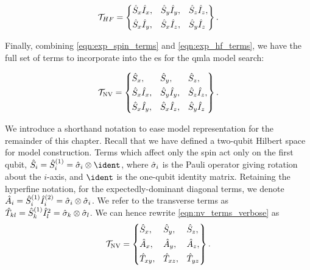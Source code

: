 \begin{equation}
    \mathcal{T}_{HF} = \left\{
    \begin{align}  
        \begin{split}
        & \hat{S}_x\hat{I}_x, && \hat{S}_y\hat{I}_y, && \hat{S}_z\hat{I}_z, \\
        & \hat{S}_x\hat{I}_y, && \hat{S}_x\hat{I}_z, && \hat{S}_y\hat{I}_z 
        \end{split}
    \end{align}
    \right\}.
    \label{eqn:exp_hf_terms}
\end{equation}

\par 

Finally, combining \cref{eqn:exp_spin_terms} and \cref{eqn:exp_hf_terms}, 
    we have the full set of terms to incorporate into the \gls{es} for the \gls{qmla} \gls{model search}: 

\begin{equation}
    \mathcal{T}_{\textrm{NV}} = \left\{
    \begin{align}
        & \hat{S}_x, && \hat{S}_y, && \hat{S}_z, \\
        & \hat{S}_x\hat{I}_x, && \hat{S}_y\hat{I}_y, && \hat{S}_z\hat{I}_z, \\
        & \hat{S}_x\hat{I}_y, && \hat{S}_x\hat{I}_z, && \hat{S}_y\hat{I}_z 
    \end{align}
    \right\}.
    \label{eqn:nv_terms_verbose}
\end{equation}
\par 

We introduce a shorthand notation to ease model representation for the remainder of this chapter. 
Recall that we have defined a two-qubit Hilbert space for model construction.
Terms which affect only the spin act only on the first qubit, $\hat{S}_i = \hat{S}_i^{(1)} = \s_i \otimes \ident$, 
    where $\hat{\sigma}_i$ is the Pauli operator giving rotation about the $i$-axis, and 
    $\ident$ is the one-qubit identity matrix. 
Retaining the hyperfine notation, for the expectedly-dominant diagonal terms, we denote $\hat{A}_i = \hat{S}_i^{(1)} \hat{I}_i^{(2)} = \hat{\sigma}_i \otimes \hat{\sigma}_i$. 
We refer to the transverse terms as $\hat{T}_{kl} = \hat{S}_k^{(1)} \hat{I}_l^{2} = \hat{\sigma}_k \otimes \hat{\sigma}_l$. 
We can hence rewrite \cref{eqn:nv_terms_verbose} as 
\begin{equation}
    \label{eqn:nv_terms}
    \mathcal{T}_{\textrm{NV}} = \left\{ 
        \begin{split}    
            &\hat{S}_x, && \hat{S}_y,  && \hat{S}_z, \\
            &\hat{A}_x,  && \hat{A}_y,  && \hat{A}_z, \\
            &\hat{T}_{xy},  && \hat{T}_{xz}, && \hat{T}_{yz} 
        \end{split}
    \right\}.
\end{equation}

